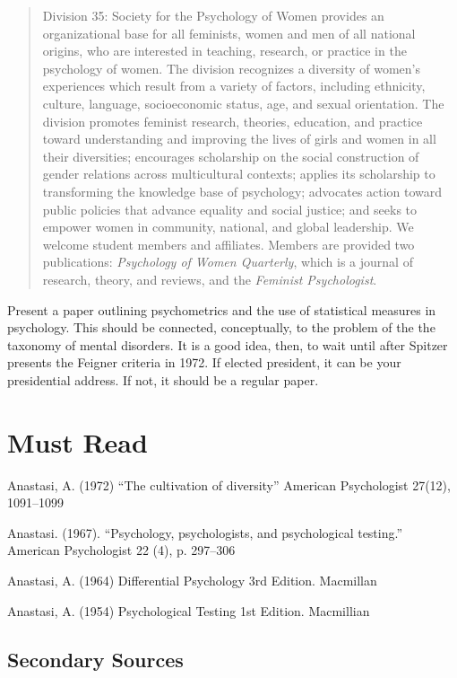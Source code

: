 \begin{refsection}
\begin{quote}
Division 35: Society for the Psychology of Women provides an organizational base for all feminists, women and men of all national origins, who are interested in teaching, research, or practice in the psychology of women. The division recognizes a diversity of women's experiences which result from a variety of factors, including ethnicity, culture, language, socioeconomic status, age, and sexual orientation. The division promotes feminist research, theories, education, and practice toward understanding and improving the lives of girls and women in all their diversities; encourages scholarship on the social construction of gender relations across multicultural contexts; applies its scholarship to transforming the knowledge base of psychology; advocates action toward public policies that advance equality and social justice; and seeks to empower women in community, national, and global leadership. We welcome student members and affiliates. Members are provided two publications: \emph{Psychology of Women Quarterly}, which is a journal of research, theory, and reviews, and the \emph{Feminist Psychologist}.
\end{quote}

Present a paper outlining psychometrics and the use of statistical measures in psychology. This should be connected, conceptually, to the problem of the the taxonomy of mental disorders. It is a good idea, then, to wait until after Spitzer presents the Feigner criteria in 1972. If elected president, it can be your presidential address. If not, it should be a regular paper.

\section{Must Read}
\label{mustread}

Anastasi, A. (1972) ``The cultivation of diversity'' American Psychologist 27(12), 1091--1099

Anastasi. (1967). ``Psychology, psychologists, and psychological testing.'' American Psychologist 22 (4), p. 297--306

Anastasi, A. (1964) Differential Psychology 3rd Edition. Macmillan

Anastasi, A. (1954) Psychological Testing 1st Edition. Macmillian

\subsection{Secondary Sources}
\label{secondarysources}


\end{refsection}
